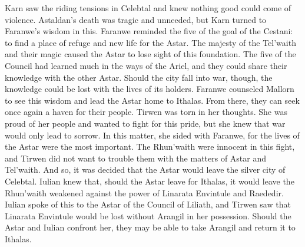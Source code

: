 \documentclass[smalldemyvopaper,11pt,twoside,onecolumn,openright,extrafontsizes]{memoir}
\begin{document}
Karn saw the riding tensions in Celebtal and knew nothing good could come of violence. Astaldan’s death was tragic and unneeded, but Karn turned to Faranwe’s wisdom in this. Faranwe reminded the five of the goal of the Cestani: to find a place of refuge and new life for the Astar. The majesty of the Tel’waith and their magic caused the Astar to lose sight of this foundation. The five of the Council had learned much in the ways of the Ariel, and they could share their knowledge with the other Astar. Should the city fall into war, though, the knowledge could be lost with the lives of its holders. Faranwe counseled Mallorn to see this wisdom and lead the Astar home to Ithalas. From there, they can seek once again a haven for their people.
Tirwen was torn in her thoughts. She was proud of her people and wanted to fight for this pride, but she knew that war would only lead to sorrow. In this matter, she sided with Faranwe, for the lives of the Astar were the most important. The Rhun’waith were innocent in this fight, and Tirwen did not want to trouble them with the matters of Astar and Tel’waith.
And so, it was decided that the Astar would leave the silver city of Celebtal. Iulian knew that, should the Astar leave for Ithalas, it would leave the Rhun’waith weakened against the power of Linarata Envintule and Raededir. Iulian spoke of this to the Astar of the Council of Liliath, and Tirwen saw that Linarata Envintule would be lost without Arangil in her possession. Should the Astar and Iulian confront her, they may be able to take Arangil and return it to Ithalas.
\end{document}
